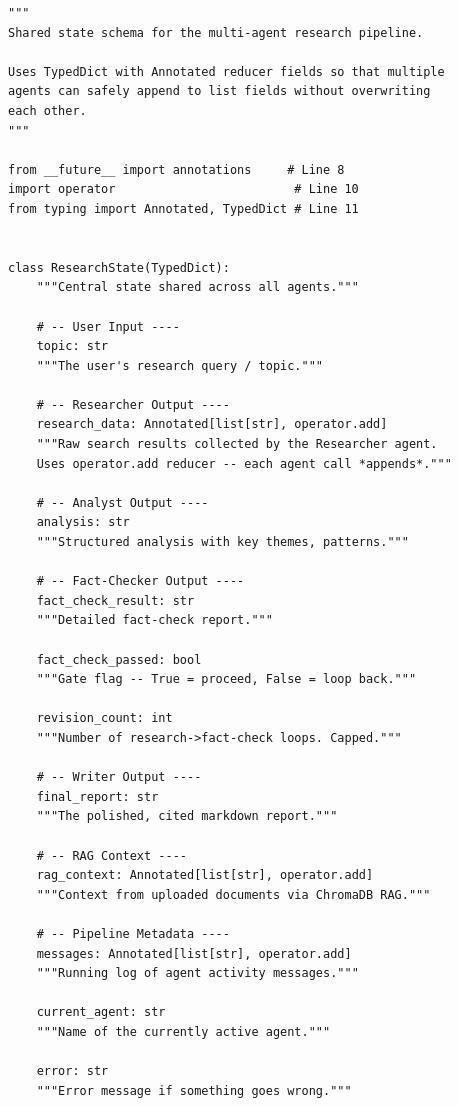 \documentclass[12pt, a4paper]{article}
\begin{document}
\begin{lstlisting}[style=pythonstyle, title={\color{accentgreen}\faIcon{file} state/schema.py --- Full Code}]
"""
Shared state schema for the multi-agent research pipeline.

Uses TypedDict with Annotated reducer fields so that multiple
agents can safely append to list fields without overwriting
each other.
"""

from __future__ import annotations     # Line 8
import operator                         # Line 10
from typing import Annotated, TypedDict # Line 11


class ResearchState(TypedDict):
    """Central state shared across all agents."""

    # -- User Input ----
    topic: str
    """The user's research query / topic."""

    # -- Researcher Output ----
    research_data: Annotated[list[str], operator.add]
    """Raw search results collected by the Researcher agent.
    Uses operator.add reducer -- each agent call *appends*."""

    # -- Analyst Output ----
    analysis: str
    """Structured analysis with key themes, patterns."""

    # -- Fact-Checker Output ----
    fact_check_result: str
    """Detailed fact-check report."""

    fact_check_passed: bool
    """Gate flag -- True = proceed, False = loop back."""

    revision_count: int
    """Number of research->fact-check loops. Capped."""

    # -- Writer Output ----
    final_report: str
    """The polished, cited markdown report."""

    # -- RAG Context ----
    rag_context: Annotated[list[str], operator.add]
    """Context from uploaded documents via ChromaDB RAG."""

    # -- Pipeline Metadata ----
    messages: Annotated[list[str], operator.add]
    """Running log of agent activity messages."""

    current_agent: str
    """Name of the currently active agent."""

    error: str
    """Error message if something goes wrong."""
\end{lstlisting}
\end{document}
